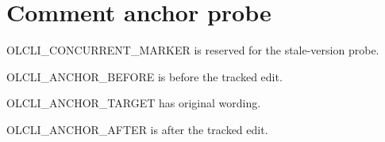 \section{Comment anchor probe}

OLCLI_CONCURRENT_MARKER is reserved for the stale-version probe.

OLCLI_ANCHOR_BEFORE is before the tracked edit.

OLCLI_ANCHOR_TARGET has original wording.

OLCLI_ANCHOR_AFTER is after the tracked edit.
